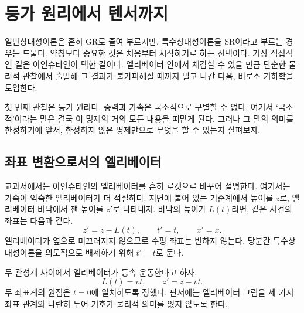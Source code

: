 \chapter{등가 원리에서 텐서까지}

일반상대성이론은 흔히 GR로 줄여 부르지만, 특수상대성이론을 SR이라고 부르는 경우는 드물다. 약칭보다 중요한 것은 처음부터 시작하기로 하는 선택이다. 가장 직접적인 길은 아인슈타인이 택한 길이다. 엘리베이터 안에서 체감할 수 있을 만큼 단순한 물리적 관찰에서 출발해 그 결과가 불가피해질 때까지 밀고 나간 다음, 비로소 기하학을 도입한다.

첫 번째 관찰은 등가 원리다. 중력과 가속은 국소적으로 구별할 수 없다. 여기서 ‘국소적’이라는 말은 결국 이 명제의 거의 모든 내용을 떠맡게 된다. 그러나 그 말의 의미를 한정하기에 앞서, 한정하지 않은 명제만으로 무엇을 할 수 있는지 살펴보자.

\section{좌표 변환으로서의 엘리베이터}

교과서에서는 아인슈타인의 엘리베이터를 흔히 로켓으로 바꾸어 설명한다. 여기서는 가속이 익숙한 엘리베이터가 더 적절하다. 지면에 붙어 있는 기준계에서 높이를 \(z\)로, 엘리베이터 바닥에서 잰 높이를 \(z'\)로 나타내자. 바닥의 높이가 \(L(t)\)라면, 같은 사건의 좌표는 다음과 같다.
\begin{equation}
 z'=z-L(t),\qquad t'=t,\qquad x'=x.
\label{eq:elevator-map}
\end{equation}
엘리베이터가 옆으로 미끄러지지 않으므로 수평 좌표는 변하지 않는다. 당분간 특수상대성이론을 의도적으로 배제하기 위해 \(t'=t\)로 둔다.

\begin{classroomqa}
\end{classroomqa}

두 관성계 사이에서 엘리베이터가 등속 운동한다고 하자.
\begin{equation}
 L(t)=vt,\qquad z'=z-vt.
\label{eq:galilean-elevator}
\end{equation}
두 좌표계의 원점은 \(t=0\)에 일치하도록 정했다. 판서에는 엘리베이터 그림을 세 가지 좌표 관계와 나란히 두어 기호가 물리적 의미를 잃지 않도록 한다.

